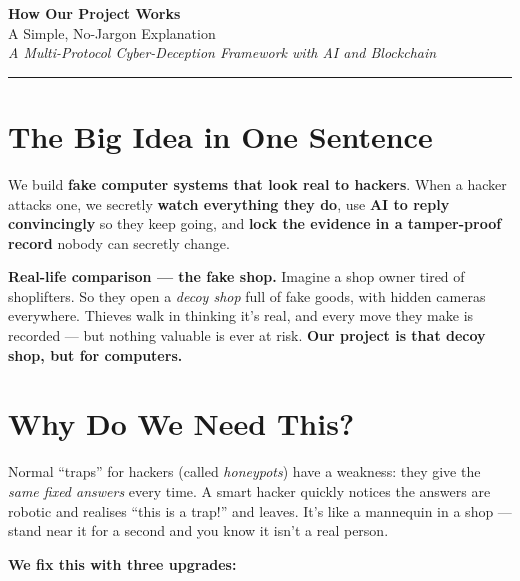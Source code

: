 \documentclass[11pt]{article}
\begin{document}
\begin{center}
{\LARGE\bfseries\color{ink} How Our Project Works}\\[2pt]
{\large A Simple, No-Jargon Explanation}\\[4pt]
{\small\itshape A Multi-Protocol Cyber-Deception Framework with AI and Blockchain}
\end{center}

\hrule
\vspace{6pt}

\section*{\color{blue}The Big Idea in One Sentence}

We build \textbf{fake computer systems that look real to hackers}. When a hacker
attacks one, we secretly \textbf{watch everything they do}, use \textbf{AI to
reply convincingly} so they keep going, and \textbf{lock the evidence in a
tamper-proof record} nobody can secretly change.

\begin{analogy}
\textbf{Real-life comparison --- the fake shop.} Imagine a shop owner tired of
shoplifters. So they open a \emph{decoy shop} full of fake goods, with hidden
cameras everywhere. Thieves walk in thinking it's real, and every move they make
is recorded --- but nothing valuable is ever at risk. \textbf{Our project is
that decoy shop, but for computers.}
\end{analogy}

\section*{\color{blue}Why Do We Need This?}

Normal ``traps'' for hackers (called \emph{honeypots}) have a weakness: they give
the \emph{same fixed answers} every time. A smart hacker quickly notices the
answers are robotic and realises ``this is a trap!'' and leaves. It's like a
mannequin in a shop --- stand near it for a second and you know it isn't a real
person.

\textbf{We fix this with three upgrades:}
\end{document}
